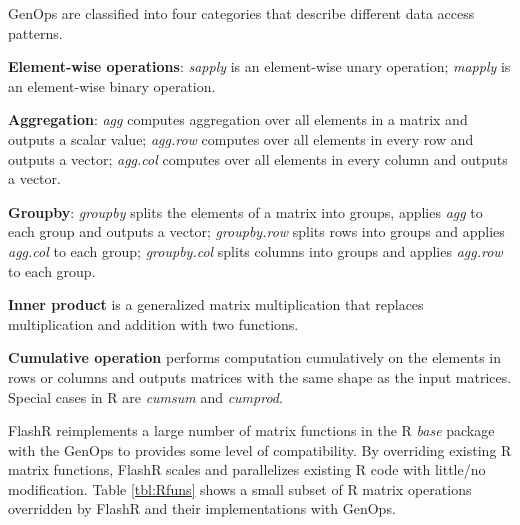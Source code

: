 GenOps are classified into four categories that describe different data access
patterns.

\noindent \textbf{Element-wise operations}:
\textit{sapply} is an element-wise unary operation; \textit{mapply}
is an element-wise binary operation.

\noindent \textbf{Aggregation}: \textit{agg} computes aggregation over
all elements in a matrix and outputs a scalar value; \textit{agg.row}
computes over all elements in every row and outputs a vector;
\textit{agg.col} computes over all elements in every column and
outputs a vector.

\noindent \textbf{Groupby}: \textit{groupby} splits the elements of a matrix
into groups, applies \textit{agg} to each group and outputs a vector;
\textit{groupby.row} splits rows into groups and applies \textit{agg.col}
to each group; \textit{groupby.col} splits columns into groups and applies
\textit{agg.row} to each group.

\noindent \textbf{Inner product} is a generalized matrix multiplication
that replaces multiplication and addition with two functions.

\noindent \textbf{Cumulative operation} performs computation cumulatively
on the elements in rows or columns and outputs matrices with the same
shape as the input matrices. Special cases in R are \textit{cumsum} and
\textit{cumprod}.

FlashR reimplements a large number of matrix functions in the R \textit{base}
package with the GenOps to provides some level of compatibility.
By overriding existing R matrix functions, FlashR scales and parallelizes
existing R code with little/no modification. Table \ref{tbl:Rfuns} shows
a small subset of R matrix operations overridden by FlashR and their
implementations with GenOps.

